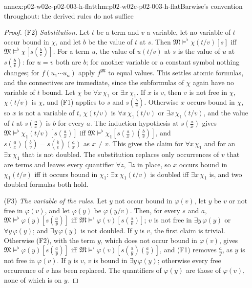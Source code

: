 \begin{annexitem}{annex:p02-w02c-p02-003-h-flat}{thm:p02-w02c-p02-003-h-flat}{Barwise's convention throughout: the derived rules do not suffice}
\begin{proof}
(F2) \emph{Substitution.}  Let \(t\) be a term and \(v\) a variable, let no
variable of \(t\) occur bound in \(\chi\), and let \(b\) be the value of
\(t\) at \(s\).  Then \(\mathfrak M\models^{\flat}\chi(t/v)[s]\) iff
\(\mathfrak M\models^{\flat}\chi[s(\tfrac bv)]\).  For a term \(u\), the
value of \(u(t/v)\) at \(s\) is the value of \(u\) at \(s(\tfrac bv)\): for
\(u=v\) both are \(b\); for another variable or a constant symbol nothing
changes; for \(f(u_1\cdots u_n)\) apply \(f^{\mathfrak M}\) to equal values.
This settles atomic formulas, and the connectives are immediate, since the
subformulas of \(\chi\) again have no variable of \(t\) bound.  Let \(\chi\)
be \(\forall x\,\chi_1\) or \(\exists x\,\chi_1\).  If \(x\) is \(v\), then
\(v\) is not free in \(\chi\), \(\chi(t/v)\) is \(\chi\), and (F1) applies
to \(s\) and \(s(\tfrac bv)\).  Otherwise \(x\) occurs bound in \(\chi\), so
\(x\) is not a variable of \(t\), \(\chi(t/v)\) is \(\forall x\,\chi_1(t/v)\)
or \(\exists x\,\chi_1(t/v)\), and the value of \(t\) at \(s(\tfrac ax)\) is
\(b\) for every \(a\).  The induction hypothesis at \(s(\tfrac ax)\) gives
\(\mathfrak M\models^{\flat}\chi_1(t/v)[s(\tfrac ax)]\) iff
\(\mathfrak M\models^{\flat}\chi_1[s(\tfrac ax)(\tfrac bv)]\), and
\(s(\tfrac ax)(\tfrac bv)=s(\tfrac bv)(\tfrac ax)\) as \(x\neq v\).  This
gives the claim for \(\forall x\,\chi_1\) and for an \(\exists x\,\chi_1\)
that is not doubled.  The substitution replaces only occurrences of \(v\)
that are terms and leaves every quantifier \(\forall z\), \(\exists z\) in
place, so \(x\) occurs bound in \(\chi_1(t/v)\) iff it occurs bound in
\(\chi_1\): \(\exists x\,\chi_1(t/v)\) is doubled iff \(\exists x\,\chi_1\)
is, and two doubled formulas both hold.

(F3) \emph{The variable of the rules.}  Let \(y\) not occur bound in
\(\varphi(v)\), let \(y\) be \(v\) or not free in \(\varphi(v)\), and let
\(\varphi(y)\) be \(\varphi(y/v)\).  Then, for every \(s\) and \(a\),
\(\mathfrak M\models^{\flat}\varphi(y)[s(\tfrac ay)]\) iff
\(\mathfrak M\models^{\flat}\varphi(v)[s(\tfrac av)]\); \(v\) is not free in
\(\exists y\,\varphi(y)\) or \(\forall y\,\varphi(y)\); and
\(\exists y\,\varphi(y)\) is not doubled.  If \(y\) is \(v\), the first
claim is trivial.  Otherwise (F2), with the term \(y\), which does not
occur bound in \(\varphi(v)\), gives
\(\mathfrak M\models^{\flat}\varphi(y)[s(\tfrac ay)]\) iff
\(\mathfrak M\models^{\flat}\varphi(v)[s(\tfrac ay)(\tfrac av)]\), and (F1)
removes \(\tfrac ay\), as \(y\) is not free in \(\varphi(v)\).  If \(y\) is
\(v\), \(v\) is bound in \(\exists y\,\varphi(y)\); otherwise every free
occurrence of \(v\) has been replaced.  The quantifiers of \(\varphi(y)\)
are those of \(\varphi(v)\), none of which is on \(y\).


\end{proof}
\end{annexitem}
